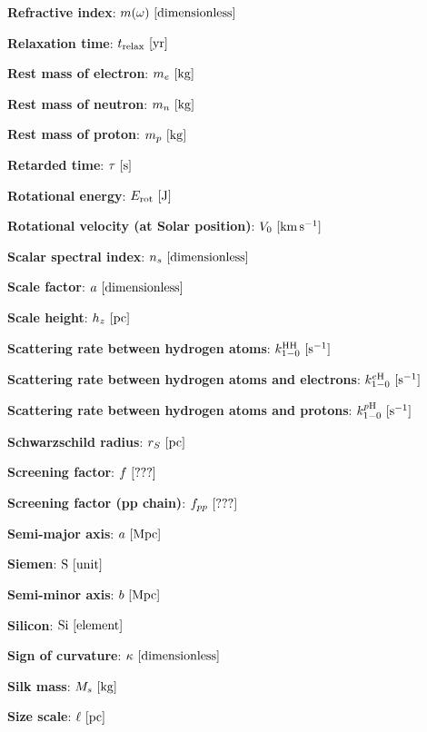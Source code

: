 \documentclass[a4paper,10pt]{article}
\begin{document}
{\noindent}\textbf{Refractive index}: $m(\omega) ~ [{\rm dimensionless}]$

{\noindent}\textbf{Relaxation time}: $t_\mathrm{relax} ~ [{\rm yr}]$

{\noindent}\textbf{Rest mass of electron}: $m_e ~ [{\rm kg}]$

{\noindent}\textbf{Rest mass of neutron}: $m_n ~ [{\rm kg}]$

{\noindent}\textbf{Rest mass of proton}: $m_p ~ [{\rm kg}]$

{\noindent}\textbf{Retarded time}: $\tau ~ [{\rm s}]$

{\noindent}\textbf{Rotational energy}: $E_{\rm rot} ~ [{\rm J}]$

{\noindent}\textbf{Rotational velocity (at Solar position)}: $V_0 ~ [{\rm km\,s^{-1}}]$

{\noindent}\textbf{Scalar spectral index}: $n_s ~ [{\rm dimensionless}]$

{\noindent}\textbf{Scale factor}: $a ~ [{\rm dimensionless}]$

{\noindent}\textbf{Scale height}: $h_z ~ [{\rm pc}]$

{\noindent}\textbf{Scattering rate between hydrogen atoms}: $k_{1-0}^\mathrm{HH} ~ [{\rm s^{-1}}]$

{\noindent}\textbf{Scattering rate between hydrogen atoms and electrons}: $k_{1-0}^{e\mathrm{H}} ~ [{\rm s^{-1}}]$

{\noindent}\textbf{Scattering rate between hydrogen atoms and protons}: $k_{1-0}^{p\mathrm{H}} ~ [{\rm s^{-1}}]$

{\noindent}\textbf{Schwarzschild radius}: $r_S ~ [{\rm pc}]$

{\noindent}\textbf{Screening factor}: $f ~ [{\rm ???}]$

{\noindent}\textbf{Screening factor (pp chain)}: $f_{pp} ~ [{\rm ???}]$

{\noindent}\textbf{Semi-major axis}: $a ~ [{\rm Mpc}]$

{\noindent}\textbf{Siemen}: ${\rm S} ~ [{\rm unit}]$

{\noindent}\textbf{Semi-minor axis}: $b ~ [{\rm Mpc}]$

{\noindent}\textbf{Silicon}: ${\rm Si} ~ [{\rm element}]$

{\noindent}\textbf{Sign of curvature}: $\kappa ~ [{\rm dimensionless}]$

{\noindent}\textbf{Silk mass}: $M_s ~ [{\rm kg}]$

{\noindent}\textbf{Size scale}: $\ell ~ [{\rm pc}]$
\end{document}
